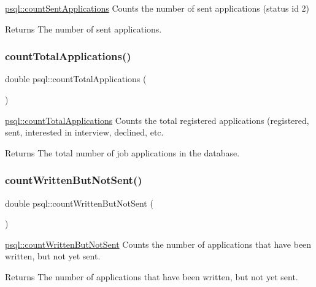 \hyperlink{classpsql_af5e6768f6c51ac7b94571505f7a628e4}{psql\+::count\+Sent\+Applications} Counts the number of sent applications (status id 2) 

\begin{DoxyReturn}{Returns}
The number of sent applications. 
\end{DoxyReturn}
\mbox{\label{classpsql_a496d0a426a1539bf9babd1dd4e9fcd96}} 
\subsubsection{\texorpdfstring{count\+Total\+Applications()}{countTotalApplications()}}
{\footnotesize\ttfamily double psql\+::count\+Total\+Applications (\begin{DoxyParamCaption}{ }\end{DoxyParamCaption})}



\hyperlink{classpsql_a496d0a426a1539bf9babd1dd4e9fcd96}{psql\+::count\+Total\+Applications} Counts the total registered applications (registered, sent, interested in interview, declined, etc. 

\begin{DoxyReturn}{Returns}
The total number of job applications in the database. 
\end{DoxyReturn}
\mbox{\label{classpsql_a70ad9f4b00735a55232f46da4edd2edc}} 
\subsubsection{\texorpdfstring{count\+Written\+But\+Not\+Sent()}{countWrittenButNotSent()}}
{\footnotesize\ttfamily double psql\+::count\+Written\+But\+Not\+Sent (\begin{DoxyParamCaption}{ }\end{DoxyParamCaption})}



\hyperlink{classpsql_a70ad9f4b00735a55232f46da4edd2edc}{psql\+::count\+Written\+But\+Not\+Sent} Counts the number of applications that have been written, but not yet sent. 

\begin{DoxyReturn}{Returns}
The number of applications that have been written, but not yet sent. 
\end{DoxyReturn}
\mbox{\label{classpsql_ae9e3ee06f4a5ecd4178662dfa0655fe1}} 
